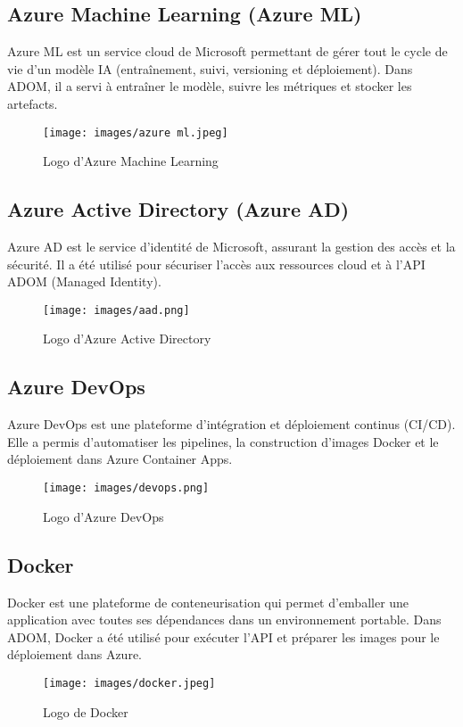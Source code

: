 \documentclass[12pt,a4paper]{report}
\begin{document}
\subsection{Azure Machine Learning (Azure ML)}
Azure ML est un service cloud de Microsoft permettant de gérer tout le cycle de vie
d’un modèle IA (entraînement, suivi, versioning et déploiement).
Dans ADOM, il a servi à entraîner le modèle, suivre les métriques et stocker les artefacts.
\begin{figure}[H]
    \centering
    \texttt{[image: images/azure ml.jpeg]}
    \caption{Logo d’Azure Machine Learning}
\end{figure}

\subsection{Azure Active Directory (Azure AD)}
Azure AD est le service d’identité de Microsoft, assurant la gestion des accès et la sécurité.
Il a été utilisé pour sécuriser l’accès aux ressources cloud et à l’API ADOM (Managed Identity).
\begin{figure}[H]
    \centering
    \texttt{[image: images/aad.png]}
    \caption{Logo d’Azure Active Directory}
\end{figure}

\subsection{Azure DevOps}
Azure DevOps est une plateforme d’intégration et déploiement continus (CI/CD).
Elle a permis d’automatiser les pipelines, la construction d’images Docker et le déploiement
dans Azure Container Apps.
\begin{figure}[H]
    \centering
    \texttt{[image: images/devops.png]}
    \caption{Logo d’Azure DevOps}
\end{figure}

\subsection{Docker}
Docker est une plateforme de conteneurisation qui permet d’emballer une application
avec toutes ses dépendances dans un environnement portable.
Dans ADOM, Docker a été utilisé pour exécuter l’API et préparer les images pour le déploiement
dans Azure.
\begin{figure}[H]
    \centering
    \texttt{[image: images/docker.jpeg]}
    \caption{Logo de Docker}
\end{figure}
\end{document}
